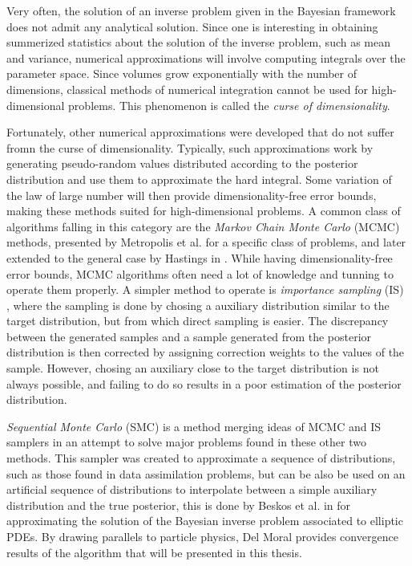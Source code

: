 Very often, the solution of an inverse problem given in the Bayesian framework does not admit any analytical solution. Since one is interesting in obtaining summerized statistics about the solution of the inverse problem, such as mean and variance, numerical approximations will involve computing integrals over the parameter space. Since volumes grow exponentially with the number of dimensions, classical methods of numerical integration cannot be used for high-dimensional problems. This phenomenon is called the \textit{curse of dimensionality}.

Fortunately, other numerical approximations were developed that do not suffer fromn the curse of dimensionality. Typically, such approximations work by generating pseudo-random values distributed according to the posterior distribution and use them to approximate the hard integral. Some variation of the law of large number will then provide dimensionality-free error bounds, making these methods suited for high-dimensional problems. A common class of algorithms falling in this category are the \textit{Markov Chain Monte Carlo} (MCMC) methods, presented by Metropolis et al. \cite{metropolis1953equation} for a specific class of problems, and later extended to the general case by Hastings in \cite{hastings1970monte}. While having dimensionality-free error bounds, MCMC algorithms often need a lot of knowledge and tunning to operate them properly. A simpler method to operate is \textit{importance sampling} (IS) , where the sampling is done by chosing a auxiliary distribution similar to the target distribution, but from which direct sampling is easier. The discrepancy between the generated samples and a sample generated from the posterior distribution is then corrected by assigning correction weights to the values of the sample. However, chosing an auxiliary close to the target distribution is not always possible, and failing to do so results in a poor estimation of the posterior distribution.

\textit{Sequential Monte Carlo} (SMC) \cite{del_moral_2006} is a method merging ideas of MCMC and IS samplers in an attempt to solve major problems found in these other two methods. This sampler was created to approximate a sequence of distributions, such as those found in data assimilation problems, but can be also be used on an artificial sequence of distributions to interpolate between a simple auxiliary distribution and the true posterior, this is done by Beskos et al. in \cite{beskos2015sequential} for approximating the solution of the Bayesian inverse problem associated to elliptic PDEs. By drawing parallels to particle physics, Del Moral \cite{del2013mean, del2004feynman} provides convergence results of the algorithm that will be presented in this thesis.

